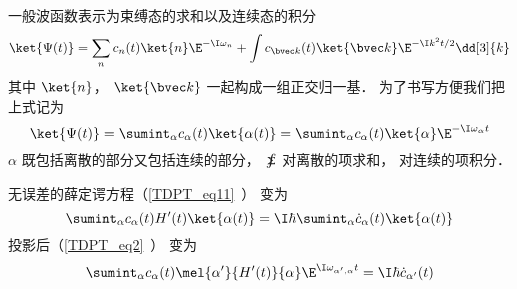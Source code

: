 

一般波函数表示为束缚态的求和以及连续态的积分
\begin{equation}
\ket{\Psi(t)} = \sum_n c_n(t)\ket{n}\E^{-\I\omega_n} + \int c_{\bvec k}(t)\ket{\bvec k}\E^{-\I k^2 t/2} \dd[3]{k}
\end{equation}
其中 $\ket{n}$， $\ket{\bvec k}$ 一起构成一组正交归一基． 为了书写方便我们把上式记为
\begin{equation}
\ket{\Psi(t)} = \sumint_\alpha c_\alpha(t) \ket{\alpha(t)} = \sumint_\alpha c_\alpha(t) \ket{\alpha}\E^{-\I\omega_\alpha t} 
\end{equation}
$\alpha$ 既包括离散的部分又包括连续的部分， $\sumint$ 对离散的项求和， 对连续的项积分．

无误差的薛定谔方程（\autoref{TDPT_eq11}~） 变为
\begin{equation}
\sumint_\alpha c_\alpha(t) H'(t) \ket{\alpha(t)} = \I \hbar \sumint_\alpha \dot c_\alpha(t) \ket{\alpha(t)}
\end{equation}
投影后（\autoref{TDPT_eq2}~） 变为
\begin{equation}
\sumint_\alpha c_\alpha(t) \mel{\alpha'}{H'(t)}{\alpha} \E^{\I \omega_{\alpha',\alpha} t} = \I \hbar \dot c_{\alpha'} (t)
\end{equation}



